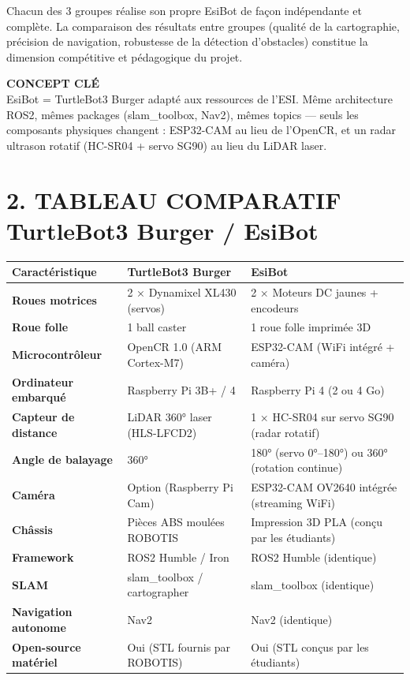 \documentclass[12pt,a4paper]{article}
\begin{document}
Chacun des 3 groupes réalise son propre EsiBot de façon indépendante et complète. La comparaison des résultats entre groupes (qualité de la cartographie, précision de navigation, robustesse de la détection d'obstacles) constitue la dimension compétitive et pédagogique du projet.

\begin{conceptbox}
\textbf{CONCEPT CLÉ}\\[4pt]
EsiBot = TurtleBot3 Burger adapté aux ressources de l'ESI. Même architecture ROS2, mêmes packages (slam\_toolbox, Nav2), mêmes topics — seuls les composants physiques changent : ESP32-CAM au lieu de l'OpenCR, et un radar ultrason rotatif (HC-SR04 + servo SG90) au lieu du LiDAR laser.
\end{conceptbox}

\section*{2. TABLEAU COMPARATIF TurtleBot3 Burger / EsiBot}

\begin{longtable}{>{\bfseries}p{4.5cm} p{5cm} p{5.5cm}}
\toprule
\textbf{Caractéristique} & \textbf{TurtleBot3 Burger} & \textbf{EsiBot} \\
\midrule
\endhead
Roues motrices & 2 × Dynamixel XL430 (servos) & 2 × Moteurs DC jaunes + encodeurs \\
Roue folle & 1 ball caster & 1 roue folle imprimée 3D \\
Microcontrôleur & OpenCR 1.0 (ARM Cortex-M7) & ESP32-CAM (WiFi intégré + caméra) \\
Ordinateur embarqué & Raspberry Pi 3B+ / 4 & Raspberry Pi 4 (2 ou 4 Go) \\
Capteur de distance & LiDAR 360° laser (HLS-LFCD2) & 1 × HC-SR04 sur servo SG90 (radar rotatif) \\
Angle de balayage & 360° & 180° (servo 0°–180°) ou 360° (rotation continue) \\
Caméra & Option (Raspberry Pi Cam) & ESP32-CAM OV2640 intégrée (streaming WiFi) \\
Châssis & Pièces ABS moulées ROBOTIS & Impression 3D PLA (conçu par les étudiants) \\
Framework & ROS2 Humble / Iron & ROS2 Humble (identique) \\
SLAM & slam\_toolbox / cartographer & slam\_toolbox (identique) \\
Navigation autonome & Nav2 & Nav2 (identique) \\
Open-source matériel & Oui (STL fournis par ROBOTIS) & Oui (STL conçus par les étudiants) \\
\bottomrule
\end{longtable}
\end{document}
